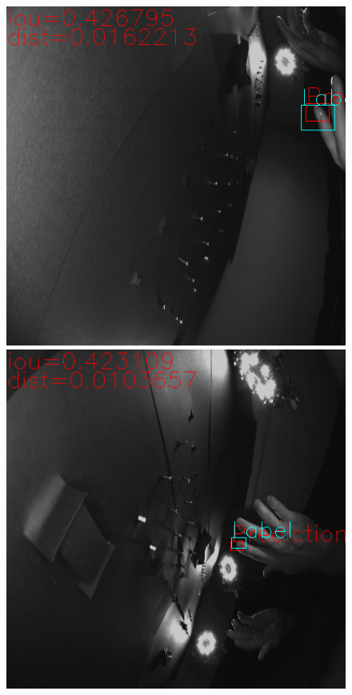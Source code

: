 \begin{figure}
	\centering
	\begin{minipage}[b]{0.48\textwidth}	
		\includegraphics[width=\textwidth]{Kapitel/70Resultate/Bilder/7iouKnappGut.png}
	\end{minipage}
	\hfill
	\begin{minipage}[b]{0.48\textwidth}		
		\includegraphics[width=\textwidth]{Kapitel/70Resultate/Bilder/8iouKnappGut.png}

\end{minipage}
\end{figure}
